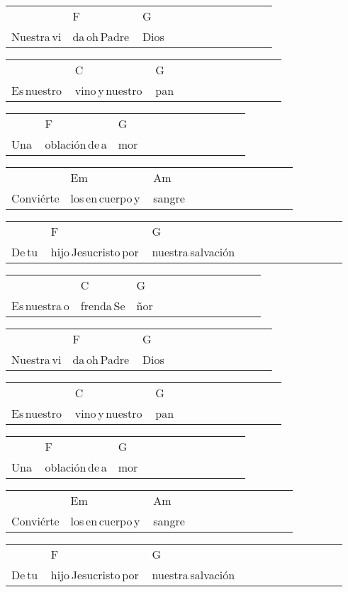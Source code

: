 \begin{multicols}{2}
\begin{minipage}{\columnwidth}
\noindent
\begin{tabular}{llllllllllll}
&F&G\\
Nuestra\,vi&da\,oh\,Padre\,&Dios
\end{tabular}

\noindent
\begin{tabular}{llllllllllll}
&C&G\\
Es\,nuestro\,&vino\,y\,nuestro\,&pan
\end{tabular}

\noindent
\begin{tabular}{llllllllllll}
&F&G\\
Una\,&oblación\,de\,a&mor
\end{tabular}

\noindent
\begin{tabular}{llllllllllll}
&Em&Am\\
Conviérte&los\,en\,cuerpo\,y\,&sangre
\end{tabular}

\noindent
\begin{tabular}{llllllllllll}
&F&G\\
De\,tu\,&hijo\,Jesucristo\,por\,&nuestra\,salvación
\end{tabular}

\noindent
\begin{tabular}{llllllllllll}
&C&G\\
Es\,nuestra\,o&frenda\,Se&ñor
\end{tabular}

\noindent
\begin{tabular}{llllllllllll}
&F&G\\
Nuestra\,vi&da\,oh\,Padre\,&Dios
\end{tabular}

\noindent
\begin{tabular}{llllllllllll}
&C&G\\
Es\,nuestro\,&vino\,y\,nuestro\,&pan
\end{tabular}

\noindent
\begin{tabular}{llllllllllll}
&F&G\\
Una\,&oblación\,de\,a&mor
\end{tabular}

\noindent
\begin{tabular}{llllllllllll}
&Em&Am\\
Conviérte&los\,en\,cuerpo\,y\,&sangre
\end{tabular}

\noindent
\begin{tabular}{llllllllllll}
&F&G\\
De\,tu\,&hijo\,Jesucristo\,por\,&nuestra\,salvación
\end{tabular}


\end{minipage}
\end{multicols}
